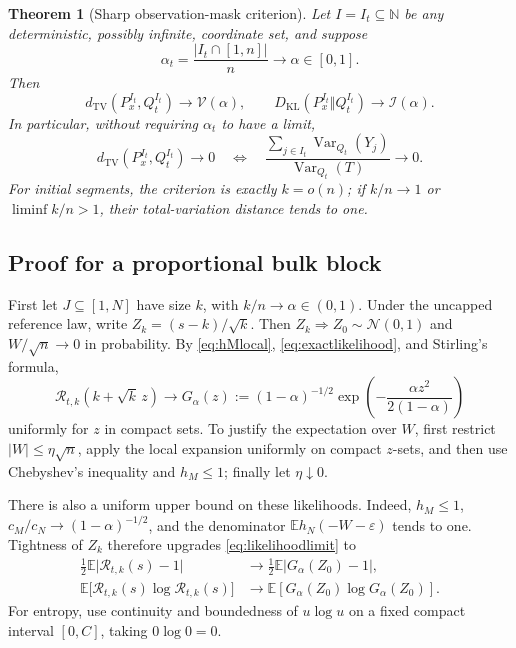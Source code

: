 \documentclass[11pt,letterpaper]{article}
\numberwithin{equation}{section}
\newtheorem{theorem}{Theorem}[section]
\theoremstyle{definition}
\theoremstyle{remark}
\newcommand{\EE}{\mathbb E}
\newcommand{\NN}{\mathbb N}
\newcommand{\TV}{d_{\mathrm{TV}}}
\newcommand{\KL}{D_{\mathrm{KL}}}
\newcommand{\Var}{\operatorname{Var}}
\newcommand{\Normal}{\mathcal N}
\newcommand{\eps}{\varepsilon}
\newcommand{\vp}{\mathcal V}
\newcommand{\ip}{\mathcal I}
\begin{document}
\begin{theorem}[Sharp observation-mask criterion]
\label{thm:mask}
Let $I=I_t\subseteq\NN$ be any deterministic, possibly infinite, coordinate
set, and suppose
\[
 \alpha_t=\frac{|I_t\cap[1,n]|}{n}\longrightarrow\alpha\in[0,1].
\]
Then
\begin{equation}
 \TV(P_x^{I_t},Q_t^{I_t})\longrightarrow\vp(\alpha),\qquad
 \KL(P_x^{I_t}\Vert Q_t^{I_t})\longrightarrow\ip(\alpha).
 \label{eq:masktheorem}
\end{equation}
In particular, without requiring $\alpha_t$ to have a limit,
\begin{equation}
 \TV(P_x^{I_t},Q_t^{I_t})\longrightarrow0
 \quad\Longleftrightarrow\quad
 \frac{\sum_{j\in I_t}\Var_{Q_t}(Y_j)}{\Var_{Q_t}(T)}\longrightarrow0.
 \label{eq:variancecriterion}
\end{equation}
For initial segments, the criterion is exactly $k=o(n)$; if $k/n\to1$ or
$\liminf k/n>1$, their total-variation distance tends to one.
\end{theorem}

\subsection{Proof for a proportional bulk block}

First let $J\subseteq[1,N]$ have size $k$, with $k/n\to\alpha\in(0,1)$.
Under the uncapped reference law, write $Z_k=(s-k)/\sqrt k$.
Then $Z_k\Rightarrow Z_0\sim\Normal(0,1)$ and $W/\sqrt n\to0$ in probability.
By \eqref{eq:hMlocal}, \eqref{eq:exactlikelihood}, and Stirling's formula,
\begin{equation}
 \mathcal R_{t,k}(k+\sqrt k\,z)
 \longrightarrow
 G_\alpha(z):=(1-\alpha)^{-1/2}
 \exp\left(-\frac{\alpha z^2}{2(1-\alpha)}\right)
 \label{eq:likelihoodlimit}
\end{equation}
uniformly for $z$ in compact sets. To justify the expectation over $W$, first
restrict $|W|\le\eta\sqrt n$, apply the local expansion uniformly on compact
$z$-sets, and then use Chebyshev's inequality and $h_M\le1$; finally let
$\eta\downarrow0$.

There is also a uniform upper bound on these likelihoods. Indeed, $h_M\le1$,
$c_M/c_N\to(1-\alpha)^{-1/2}$, and the denominator
$\EE h_N(-W-\eps)$ tends to one. Tightness of $Z_k$ therefore upgrades
\eqref{eq:likelihoodlimit} to
\begin{align}
 \frac12\EE\big|\mathcal R_{t,k}(s)-1\big|
 &\longrightarrow\frac12\EE|G_\alpha(Z_0)-1|,\label{eq:TVlimitproof}\\
 \EE\big[\mathcal R_{t,k}(s)\log\mathcal R_{t,k}(s)\big]
 &\longrightarrow\EE[G_\alpha(Z_0)\log G_\alpha(Z_0)].
 \label{eq:KLlimitproof}
\end{align}
For entropy, use continuity and boundedness of $u\log u$ on a fixed compact
interval $[0,C]$, taking $0\log0=0$.
\end{document}
